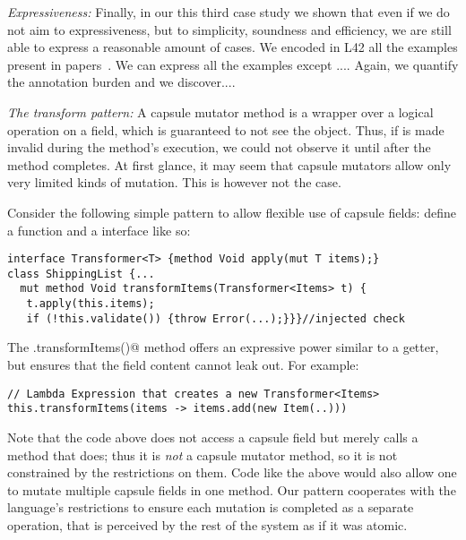 \noindent\textit{Expressiveness:}
Finally, in our this third case study we 
shown that even if we do not aim to expressiveness, but to simplicity, soundness and efficiency, we are still able to express a reasonable amount of cases.
We encoded in L42 all the examples present in papers~\cite{??}.
We can express all the examples except ....
Again, we quantify the annotation burden and we discover....


\noindent\textit{The transform pattern:}
A capsule mutator method is a wrapper over a logical operation on a field, which is guaranteed to not see the \Q@this@ object.
Thus, if \Q@this@ is made invalid during 
the method's execution, we could not observe it until after the method completes.
At first glance, it may seem that capsule mutators allow only very limited kinds of mutation.
This is however not the case. 

Consider the following
simple pattern to allow flexible use of capsule fields: define a \Q@transform@ function and a \Q@ItemTransformer@ interface like so:
\saveSpace
\begin{lstlisting}
interface Transformer<T> {method Void apply(mut T items);}
class ShippingList {...
  mut method Void transformItems(Transformer<Items> t) {
   t.apply(this.items);
   if (!this.validate()) {throw Error(...);}}}//injected check
\end{lstlisting}
The \Q@.transformItems()@ method 
offers an expressive power similar to a
\Q@mut@ getter, but ensures that 
the field content cannot leak out.
For example:
\begin{lstlisting}[escapechar=\%]
// Lambda Expression that creates a new Transformer<Items>
this.transformItems(items -> items.add(new Item(..)))
\end{lstlisting}


Note that the code above does not access a capsule field but merely calls a method that does; thus
it is \emph{not} a capsule mutator method, so it is not constrained by the restrictions on them. Code like the above would also allow one to mutate multiple capsule fields in one method.
Our pattern cooperates with the language’s restrictions to ensure each mutation is completed as a separate operation, that is perceived by the rest of the system
as if it was atomic.%


